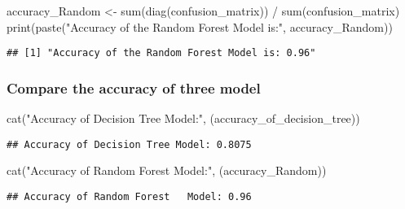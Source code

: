 \documentclass[
]{article}
\newenvironment{Shaded}{\begin{snugshade}}{\end{snugshade}}
\newcommand{\FunctionTok}[1]{\textcolor[rgb]{0.00,0.00,0.00}{#1}}
\newcommand{\NormalTok}[1]{#1}
\newcommand{\OtherTok}[1]{\textcolor[rgb]{0.56,0.35,0.01}{#1}}
\newcommand{\SpecialCharTok}[1]{\textcolor[rgb]{0.00,0.00,0.00}{#1}}
\newcommand{\StringTok}[1]{\textcolor[rgb]{0.31,0.60,0.02}{#1}}
\begin{document}
\begin{Shaded}
\begin{Highlighting}[]
\NormalTok{accuracy\_Random }\OtherTok{\textless{}{-}} \FunctionTok{sum}\NormalTok{(}\FunctionTok{diag}\NormalTok{(confusion\_matrix)) }\SpecialCharTok{/} \FunctionTok{sum}\NormalTok{(confusion\_matrix)}
\FunctionTok{print}\NormalTok{(}\FunctionTok{paste}\NormalTok{(}\StringTok{"Accuracy of the Random Forest Model is:"}\NormalTok{, accuracy\_Random))}
\end{Highlighting}
\end{Shaded}

\begin{verbatim}
## [1] "Accuracy of the Random Forest Model is: 0.96"
\end{verbatim}

\hypertarget{compare-the-accuracy-of-three-model}{%
\subsubsection{Compare the accuracy of three
model}\label{compare-the-accuracy-of-three-model}}

\begin{Shaded}
\begin{Highlighting}[]
\FunctionTok{cat}\NormalTok{(}\StringTok{"Accuracy of Decision Tree Model:"}\NormalTok{, (accuracy\_of\_decision\_tree))}
\end{Highlighting}
\end{Shaded}

\begin{verbatim}
## Accuracy of Decision Tree Model: 0.8075
\end{verbatim}

\begin{Shaded}
\begin{Highlighting}[]
\FunctionTok{cat}\NormalTok{(}\StringTok{"Accuracy of Random Forest   Model:"}\NormalTok{, (accuracy\_Random))}
\end{Highlighting}
\end{Shaded}

\begin{verbatim}
## Accuracy of Random Forest   Model: 0.96
\end{verbatim}
\end{document}
